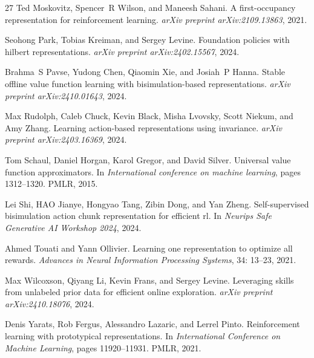 \documentclass{article}
\begin{document}
\begin{thebibliography}{27}
Ted Moskovitz, Spencer~R Wilson, and Maneesh Sahani.
\newblock A first-occupancy representation for reinforcement learning.
\newblock \emph{arXiv preprint arXiv:2109.13863}, 2021.

Seohong Park, Tobias Kreiman, and Sergey Levine.
\newblock Foundation policies with hilbert representations.
\newblock \emph{arXiv preprint arXiv:2402.15567}, 2024.

Brahma~S Pavse, Yudong Chen, Qiaomin Xie, and Josiah~P Hanna.
\newblock Stable offline value function learning with bisimulation-based representations.
\newblock \emph{arXiv preprint arXiv:2410.01643}, 2024.

Max Rudolph, Caleb Chuck, Kevin Black, Misha Lvovsky, Scott Niekum, and Amy Zhang.
\newblock Learning action-based representations using invariance.
\newblock \emph{arXiv preprint arXiv:2403.16369}, 2024.

Tom Schaul, Daniel Horgan, Karol Gregor, and David Silver.
\newblock Universal value function approximators.
\newblock In \emph{International conference on machine learning}, pages 1312--1320. PMLR, 2015.

Lei Shi, HAO Jianye, Hongyao Tang, Zibin Dong, and Yan Zheng.
\newblock Self-supervised bisimulation action chunk representation for efficient rl.
\newblock In \emph{Neurips Safe Generative AI Workshop 2024}, 2024.

Ahmed Touati and Yann Ollivier.
\newblock Learning one representation to optimize all rewards.
\newblock \emph{Advances in Neural Information Processing Systems}, 34: 13--23, 2021.

Max Wilcoxson, Qiyang Li, Kevin Frans, and Sergey Levine.
\newblock Leveraging skills from unlabeled prior data for efficient online exploration.
\newblock \emph{arXiv preprint arXiv:2410.18076}, 2024.

Denis Yarats, Rob Fergus, Alessandro Lazaric, and Lerrel Pinto.
\newblock Reinforcement learning with prototypical representations.
\newblock In \emph{International Conference on Machine Learning}, pages 11920--11931. PMLR, 2021.


\end{thebibliography}
\end{document}
